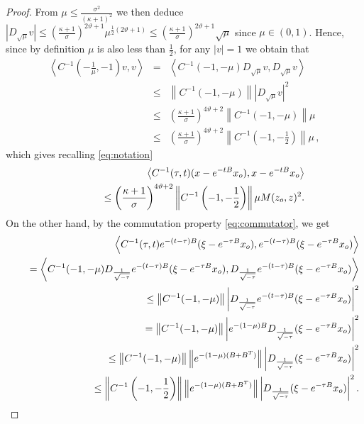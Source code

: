 \documentclass{amsart}
\numberwithin{equation}{section}
\begin{document}
{{\begin{proof}
From $\mu\leq \frac{\sigma^2}{(\kappa+1)^2}$ we then deduce $\left|D_{\sqrt{\mu}}v\right|\leq \left(\frac{\kappa+1}{\sigma}\right)^{2\vartheta +1}\mu^{\frac{1}{2}(2\vartheta +1)} \leq \left(\frac{\kappa+1}{\sigma}\right)^{2\vartheta +1}\sqrt{\mu} $ since $\mu \in (0,1)$. Hence, since by definition $\mu$ is also less than $\frac{1}{2}$,  for any $|v|=1$ we obtain that
\begin{eqnarray*}
\left\langle C^{-1}\left(-\frac{1}{\mu},-1\right)v,v \right\rangle&=&\left\langle C^{-1}(-1,-\mu)D_{\sqrt{\mu}}v,D_{\sqrt{\mu}}v\right\rangle\\
& \leq &  \left\|C^{-1}(-1,-\mu)\right\|\left|D_{\sqrt{\mu}}v\right|^2\\
&\leq& \left(\frac{\kappa+1}{\sigma}\right)^{4\vartheta +2}\left\|C^{-1}\left(-1,-\mu\right)\right\|\mu\\
& \leq &  \left(\frac{\kappa+1}{\sigma}\right)^{4\vartheta +2}\left\|C^{-1}\left(-1,-\frac{1}{2}\right)\right\|\mu\,,
\end{eqnarray*}
which gives recalling \eqref{eq:notation}
\begin{eqnarray*}
&& \left\langle C^{-1}(\tau,t)(x-e^{-tB}x_{\rm o}),x-e^{-tB}x_{\rm o}\right\rangle\notag\\
&& \qquad\quad \leq \left(\frac{\kappa+1}{\sigma}\right)^{4\vartheta +2}\left\|C^{-1}\left(-1,-\frac{1}{2}\right)\right\|\mu M(z_{\rm o},z)^2.
\end{eqnarray*}
On the other hand, by the commutation property \eqref{eq:commutator}, we get
\begin{eqnarray*}
&& \left\langle C^{-1}(\tau,t)e^{-(t-\tau)B}(\xi -e^{-\tau B}x_{\rm o}),e^{-(t-\tau)B}(\xi -e^{-\tau B}x_{\rm o})\right\rangle\notag\\
&& \quad =  \left\langle C^{-1}(-1,-\mu)D_{\frac{1}{\sqrt{-\tau}}}e^{-(t-\tau)B}(\xi -e^{-\tau B}x_{\rm o}),D_{\frac{1}{\sqrt{-\tau}}}e^{-(t-\tau)B}(\xi -e^{-\tau B}x_{\rm o})\right\rangle\\
&& \quad \leq\left\|C^{-1}(-1,-\mu)\right\|\left|D_{\frac{1}{\sqrt{-\tau}}}e^{-(t-\tau)B}(\xi -e^{-\tau B}x_{\rm o})\right|^2\notag\\
&& \quad = \left\|C^{-1}(-1,-\mu)\right\|\left|e^{-(1-\mu)B}D_{\frac{1}{\sqrt{-\tau}}}(\xi -e^{-\tau B}x_{\rm o})\right|^2\\
&& \quad \leq \left\|C^{-1}(-1,-\mu)\right\|\left\|e^{-(1-\mu)(B+B^T)}\right\|\left|D_{\frac{1}{\sqrt{-\tau}}}(\xi -e^{-\tau B}x_{\rm o})\right|^2\\
&& \quad \leq \left\|C^{-1}\left(-1,-\frac{1}{2}\right)\right\|\left\|e^{-(1-\mu)(B+B^T)}\right\|\left|D_{\frac{1}{\sqrt{-\tau}}}(\xi -e^{-\tau B}x_{\rm o})\right|^2.

\end{eqnarray*}
\end{proof}}}
\end{document}
